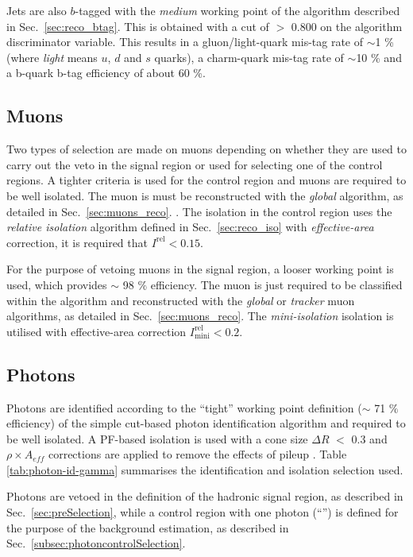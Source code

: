 Jets are also $b$-tagged with the \emph{medium} working point of the
algorithm described in Sec.~\ref{sec:reco_btag}. This is obtained with
a cut of $>$ 0.800 on the algorithm discriminator variable. This
results in a gluon/light-quark mis-tag rate of $\sim$1 \% (where
\emph{light} means $u$, $d$ and $s$ quarks), a charm-quark mis-tag
rate of $\sim$10 \% and a b-quark b-tag efficiency of about 60 \%. 


\subsection{Muons}
\label{sec:muon-id}
Two types of selection are made on muons depending on whether they are
used to carry out the veto in the signal region or used for selecting
one of the control regions. A tighter criteria is used for the control
region and muons are required to be well isolated. The muon is must be
reconstructed with the \emph{global} algorithm, as detailed
in Sec.~\ref{sec:muons_reco}. . The isolation in
the control region uses the \emph{relative isolation} algorithm
defined in Sec.~\ref{sec:reco_iso} with \emph{effective-area}
correction, it is required that $I^{\textrm{rel}}<0.15$.   

For the purpose of vetoing muons in the signal region, a looser working point 
is used, which provides $\sim$ 98 $\%$ efficiency. The muon is just
required to be classified within the \PF algorithm and reconstructed
with the \emph{global} or \emph{tracker} muon algorithms, as detailed
in Sec.~\ref{sec:muons_reco}. The
\emph{mini-isolation} isolation is utilised with effective-area \PU
correction $I^{\textrm{rel}}_{\textrm{mini}} < 0.2$. 

\subsection{Photons}
\label{sec:photon-id}
Photons are identified according to the ``tight'' working point definition ($\sim$ 71 $\%$ efficiency) 
of the simple cut-based photon identification algorithm \cite{photon-id} 
and required to be well isolated. 
A PF-based isolation is used with a cone size $\Delta R$ $<$ 0.3 and
$\rho\times A_{eff}$ corrections are applied to remove the effects of pileup \cite{pf-photon}. 
Table \ref{tab:photon-id-gamma} summarises the identification and isolation selection used. 

Photons are vetoed in the definition of the hadronic signal region, 
as described in Sec.~\ref{sec:preSelection}, while a 
control region with one photon (``\gj'') is defined for the purpose of the background estimation, 
as described in Sec.~\ref{subsec:photoncontrolSelection}.


